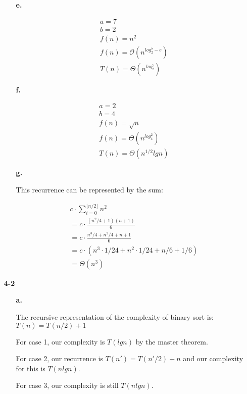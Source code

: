 \documentclass{article}
\begin{document}
\begin{enumerate}
\begin{enumerate}
\item[\textbf{e.}]

	\begin{align*}
	& a = 7 \\
	& b = 2 \\
	& f(n) = n^2 \\
	& f(n) = \mathcal{O}(n^{log_2^7 - e}) \\
	& T(n) = \Theta(n^{log_2^7})
	\end{align*}

\item[\textbf{f.}]

	\begin{align*}
	& a = 2 \\
	& b = 4 \\
	& f(n) = \sqrt{n} \\
	& f(n) = \Theta(n^{log_4^2}) \\
	& T(n) = \Theta(n^{1/2} lg n)
	\end{align*}

\item[\textbf{g.}]

This recurrence can be represented by the sum:

	\begin{align*}
	& c \cdot \sum_{i=0}^{\lfloor n/2\rfloor}n^2 \\
	& = c \cdot \frac{(n^2/4 + 1)(n + 1)}{6} \\
	& = c \cdot\frac{n^3/4 + n^2/4 + n + 1}{6} \\
	& = c \cdot (n^3 \cdot 1/24 + n^2 \cdot 1/24 + n/6 + 1/6 )\\
	& = \Theta(n^3)
	\end{align*}

\end{enumerate}

\item[\textbf{4-2}]

\begin{enumerate}

\item[\textbf{a.}]

The recursive representation of the complexity of binary sort is: $T(n) = T(n/2) + 1$

For case 1, our complexity is $T(lg n)$ by the master theorem.

For case 2, our recurrence is $T(n') = T(n'/2) + n$ and our complexity for this is $T(n lg n)$.

For case 3, our complexity is still $T(n lg n)$.


\end{enumerate}
\end{enumerate}
\end{document}
